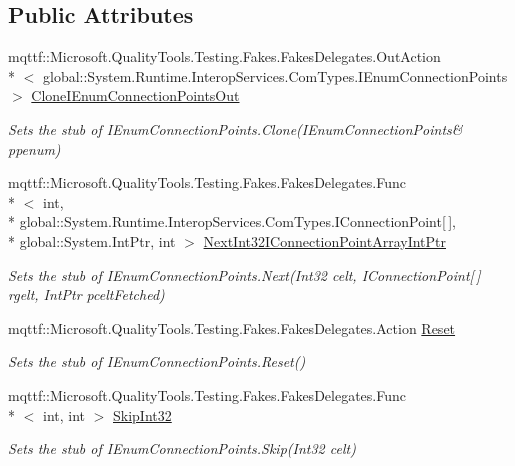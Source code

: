 \subsection*{Public Attributes}
\begin{DoxyCompactItemize}
\item 
mqttf\-::\-Microsoft.\-Quality\-Tools.\-Testing.\-Fakes.\-Fakes\-Delegates.\-Out\-Action\\*
$<$ global\-::\-System.\-Runtime.\-Interop\-Services.\-Com\-Types.\-I\-Enum\-Connection\-Points $>$ \hyperlink{class_system_1_1_runtime_1_1_interop_services_1_1_com_types_1_1_fakes_1_1_stub_i_enum_connection_points_a980f5339c0fd7e6cc180a8e6a210a3cf}{Clone\-I\-Enum\-Connection\-Points\-Out}
\begin{DoxyCompactList}\small\item\em Sets the stub of I\-Enum\-Connection\-Points.\-Clone(I\-Enum\-Connection\-Points\& ppenum)\end{DoxyCompactList}\item 
mqttf\-::\-Microsoft.\-Quality\-Tools.\-Testing.\-Fakes.\-Fakes\-Delegates.\-Func\\*
$<$ int, \\*
global\-::\-System.\-Runtime.\-Interop\-Services.\-Com\-Types.\-I\-Connection\-Point\mbox{[}$\,$\mbox{]}, \\*
global\-::\-System.\-Int\-Ptr, int $>$ \hyperlink{class_system_1_1_runtime_1_1_interop_services_1_1_com_types_1_1_fakes_1_1_stub_i_enum_connection_points_ae390d64962030eea54830f6ba8b7b97e}{Next\-Int32\-I\-Connection\-Point\-Array\-Int\-Ptr}
\begin{DoxyCompactList}\small\item\em Sets the stub of I\-Enum\-Connection\-Points.\-Next(\-Int32 celt, I\-Connection\-Point\mbox{[}$\,$\mbox{]} rgelt, Int\-Ptr pcelt\-Fetched)\end{DoxyCompactList}\item 
mqttf\-::\-Microsoft.\-Quality\-Tools.\-Testing.\-Fakes.\-Fakes\-Delegates.\-Action \hyperlink{class_system_1_1_runtime_1_1_interop_services_1_1_com_types_1_1_fakes_1_1_stub_i_enum_connection_points_a7ab3ffd213910588ffa854df4963fb5f}{Reset}
\begin{DoxyCompactList}\small\item\em Sets the stub of I\-Enum\-Connection\-Points.\-Reset()\end{DoxyCompactList}\item 
mqttf\-::\-Microsoft.\-Quality\-Tools.\-Testing.\-Fakes.\-Fakes\-Delegates.\-Func\\*
$<$ int, int $>$ \hyperlink{class_system_1_1_runtime_1_1_interop_services_1_1_com_types_1_1_fakes_1_1_stub_i_enum_connection_points_aee3ffb49d1b7f366003243a9396c813d}{Skip\-Int32}
\begin{DoxyCompactList}\small\item\em Sets the stub of I\-Enum\-Connection\-Points.\-Skip(\-Int32 celt)\end{DoxyCompactList}\end{DoxyCompactItemize}


